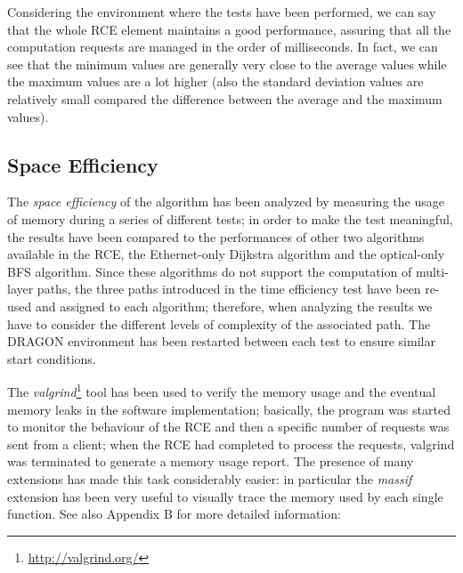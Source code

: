 \documentclass[10pt,a4paper]{report}
\begin{document}
Considering the environment where the tests have been performed, we
can say that the whole RCE element maintains a good performance,
assuring that all the computation requests are managed in the order of
milliseconds. In fact, we can see that the minimum values are
generally very close to the average values while the maximum values
are a lot higher (also the standard deviation values are relatively
small compared the difference between the average and the maximum
values).

\subsection{Space Efficiency}

The \textit{space efficiency} of the algorithm has been analyzed by
measuring the usage of memory during a series of different tests; in
order to make the test meaningful, the results have been compared to
the performances of other two algorithms available in the RCE, the
Ethernet-only Dijkstra algorithm and the optical-only BFS
algorithm. Since these algorithms do not support the computation of
multi-layer paths, the three paths introduced in the time efficiency
test have been re-used and assigned to each algorithm; therefore, when
analyzing the results we have to consider the different levels of
complexity of the associated path. The DRAGON environment has been
restarted between each test to ensure similar start conditions.

The \textit{valgrind}\footnote{\url{http://valgrind.org/}} tool has
been used to verify the memory usage and the eventual memory leaks in
the software implementation; basically, the program was started to
monitor the behaviour of the RCE and then a specific number of
requests was sent from a client; when the RCE had completed to process
the requests, valgrind was terminated to generate a memory usage
report. The presence of many extensions has made this task
considerably easier: in particular the \textit{massif} extension has
been very useful to visually trace the memory used by each single
function. See also Appendix B for more detailed information:
\end{document}
